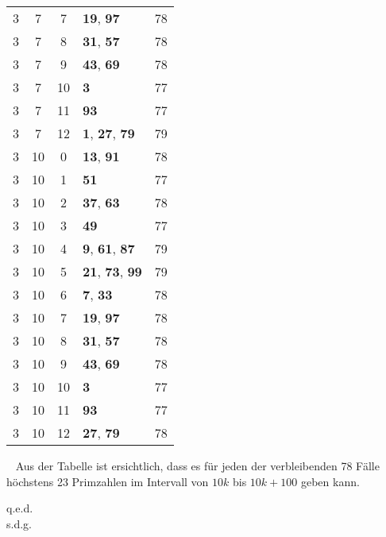 \documentclass{article}
\newcommand{\myqed}{\begin{flushright} q.e.d.\\ s.d.g.\end{flushright}}
\begin{document}
\begin{minipage}[t]{0.5\textwidth}
\begin{flushleft}
\begin{tabular}{||c|c|c|l|c||}
	3&7&7&\textbf{19}, \textbf{97}&78\\
	3&7&8&\textbf{31}, \textbf{57}&78\\
	3&7&9&\textbf{43}, \textbf{69}&78\\
	3&7&10&\textbf{3}&77\\
	3&7&11&\textbf{93}&77\\
	3&7&12&\textbf{1}, \textbf{27}, \textbf{79}&79\\
	3&10&0&\textbf{13}, \textbf{91}&78\\
	3&10&1&\textbf{51}&77\\
	3&10&2&\textbf{37}, \textbf{63}&78\\
	3&10&3&\textbf{49}&77\\
	3&10&4&\textbf{9}, \textbf{61}, \textbf{87}&79\\
	3&10&5&\textbf{21}, \textbf{73}, \textbf{99}&79\\
	3&10&6&\textbf{7}, \textbf{33}&78\\
	3&10&7&\textbf{19}, \textbf{97}&78\\
	3&10&8&\textbf{31}, \textbf{57}&78\\
	3&10&9&\textbf{43}, \textbf{69}&78\\
	3&10&10&\textbf{3}&77\\
	3&10&11&\textbf{93}&77\\
	3&10&12&\textbf{27}, \textbf{79}&78\\
\end{tabular}
\end{flushleft}
\end{minipage}
\ \newline
    Aus der Tabelle ist ersichtlich, dass es für jeden der verbleibenden 78 Fälle höchstens 23 Primzahlen im Intervall von $10k$ bis $10k+100$ geben kann.\myqed
\end{document}
